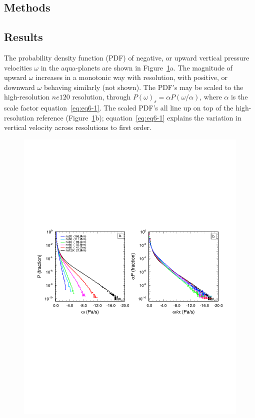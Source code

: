 \subsection{Methods}

\subsection{Results}

The probability density function (PDF) of negative, or upward vertical pressure velocities $\omega$ in the aqua-planets are shown in Figure~\ref{fig:2pdf}a. The magnitude of upward $\omega$ increases in a monotonic way with resolution, with positive, or downward $\omega$ behaving similarly (not shown). The PDF's may be scaled to the high-resolution $ne120$ resolution, through $P(\omega)_s = \alpha P (\omega / \alpha)$, where $\alpha$ is the scale factor equation~\ref{eq:eq6-1}. The scaled PDF's all line up on top of the high-resolution reference (Figure~\ref{fig:2pdf}b); equation~\ref{eq:eq6-1} explains the variation in vertical velocity across resolutions to first order. 

\begin{figure}[t]
\begin{center}
\noindent\includegraphics[width=30pc,angle=0]{chapter6/temp_2pdf.pdf}\\
\end{center}
\caption{}
\label{fig:2pdf}
\end{figure}

